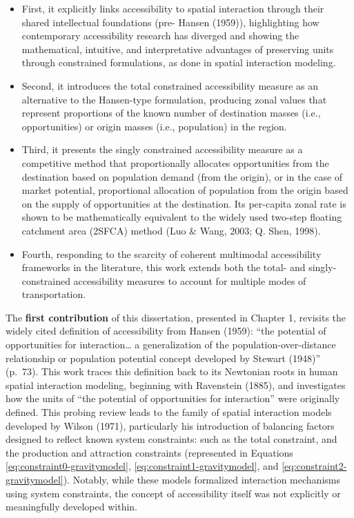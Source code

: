 \documentclass[
11pt, %
oneside, %
english, %
singlespacing, %
]{macthesis} %
\def\tightlist{}
\begin{document}
\begin{itemize}
\tightlist
\item
  First, it explicitly links accessibility to spatial interaction through their shared intellectual foundations (pre- Hansen (1959)), highlighting how contemporary accessibility research has diverged and showing the mathematical, intuitive, and interpretative advantages of preserving units through constrained formulations, as done in spatial interaction modeling.
\item
  Second, it introduces the total constrained accessibility measure as an alternative to the Hansen-type formulation, producing zonal values that represent proportions of the known number of destination masses (i.e., opportunities) or origin masses (i.e., population) in the region.
\item
  Third, it presents the singly constrained accessibility measure as a competitive method that proportionally allocates opportunities from the destination based on population demand (from the origin), or in the case of market potential, proportional allocation of population from the origin based on the supply of opportunities at the destination. Its per-capita zonal rate is shown to be mathematically equivalent to the widely used two-step floating catchment area (2SFCA) method (Luo \& Wang, 2003; Q. Shen, 1998).
\item
  Fourth, responding to the scarcity of coherent multimodal accessibility frameworks in the literature, this work extends both the total- and singly-constrained accessibility measures to account for multiple modes of transportation.
\end{itemize}

The \textbf{first contribution} of this dissertation, presented in Chapter 1, revisits the widely cited definition of accessibility from Hansen (1959): ``the potential of opportunities for interaction\ldots{} a generalization of the population-over-distance relationship or population potential concept developed by Stewart (1948)'' (p.~73). This work traces this definition back to its Newtonian roots in human spatial interaction modeling, beginning with Ravenstein (1885), and investigates how the units of ``the potential of opportunities for interaction'' were originally defined. This probing review leads to the family of spatial interaction models developed by Wilson (1971), particularly his introduction of balancing factors designed to reflect known system constraints: such as the total constraint, and the production and attraction constraints (represented in Equations \ref{eq:constraint0-gravitymodel}, \ref{eq:constraint1-gravitymodel}, and \ref{eq:constraint2-gravitymodel}). Notably, while these models formalized interaction mechanisms using system constraints, the concept of accessibility itself was not explicitly or meaningfully developed within.
\end{document}
